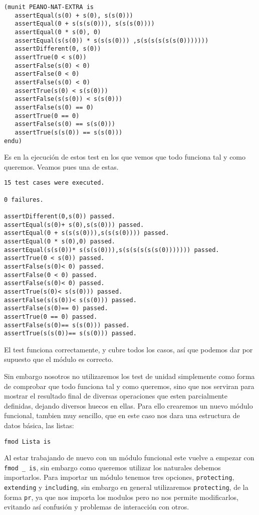 {\codesize
\begin{verbatim}
(munit PEANO-NAT-EXTRA is
   assertEqual(s(0) + s(0), s(s(0)))
   assertEqual(0 + s(s(s(0))), s(s(s(0))))
   assertEqual(0 * s(0), 0)
   assertEqual(s(s(0)) * s(s(s(0))) ,s(s(s(s(s(s(0)))))))
   assertDifferent(0, s(0))
   assertTrue(0 < s(0))
   assertFalse(s(0) < 0)
   assertFalse(0 < 0)
   assertFalse(s(0) < 0)
   assertTrue(s(0) < s(s(0)))
   assertFalse(s(s(0)) < s(s(0)))
   assertFalse(s(0) == 0)
   assertTrue(0 == 0)
   assertFalse(s(0) == s(s(0)))
   assertTrue(s(s(0)) == s(s(0)))
endu)

\end{verbatim}
}

Es en la ejecución de estos test en los que vemos que todo funciona tal y como queremos. Veamos pues una de estas. \par

\begin{verbatim}
15 test cases were executed.

0 failures.

assertDifferent(0,s(0)) passed.
assertEqual(s(0)+ s(0),s(s(0))) passed.
assertEqual(0 + s(s(s(0))),s(s(s(0)))) passed.
assertEqual(0 * s(0),0) passed.
assertEqual(s(s(0))* s(s(s(0))),s(s(s(s(s(s(0))))))) passed.
assertTrue(0 < s(0)) passed.
assertFalse(s(0)< 0) passed.
assertFalse(0 < 0) passed.
assertFalse(s(0)< 0) passed.
assertTrue(s(0)< s(s(0))) passed.
assertFalse(s(s(0))< s(s(0))) passed.
assertFalse(s(0)== 0) passed.
assertTrue(0 == 0) passed.
assertFalse(s(0)== s(s(0))) passed.
assertTrue(s(s(0))== s(s(0))) passed.
\end{verbatim}

El test funciona correctamente, y cubre todos los casos, así que podemos dar por supuesto que el módulo es correcto. \par

Sin embargo nosotros no utilizaremos los test de unidad simplemente como forma de comprobar que todo funciona tal y como queremos, sino que nos serviran para mostrar el resultado final de diversas operaciones que esten parcialmente definidas, dejando diversos huecos en ellas. Para ello crearemos un nuevo módulo funcional, tambien muy sencillo, que en este caso nos dara una estructura de datos básica, las listas: \par

{\codesize
\begin{verbatim}
fmod Lista is
\end{verbatim}
}
Al estar trabajando de nuevo con un módulo funcional este vuelve a empezar con \verb"fmod _ is", sin embargo como queremos utilizar los naturales debemos importarlos. Para importar un módulo tenemos tres opciones, \texttt{protecting}, \texttt{extending} y \texttt{including}, sin embargo en general utilizaremos \texttt{protecting}, de la forma \texttt{pr}, ya que nos importa los modulos pero no nos permite modificarlos, evitando así confusión y problemas de interacción con otros. \par

